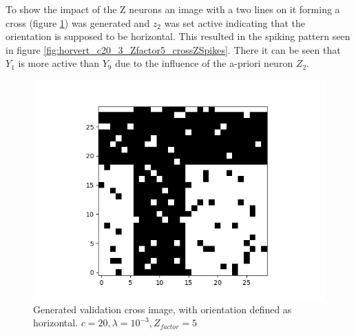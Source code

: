 To show the impact of the Z neurons an image with a two lines on it forming a cross (figure \ref{fig:horvertValidationCross}) was generated and $z_2$ was set active indicating that the orientation is supposed to be horizontal. This resulted in the spiking pattern seen in figure \ref{fig:horvert_c20_3_Zfactor5_crossZSpikes}. There it can be seen that $Y_1$ is more active than $Y_9$ due to the influence of the a-priori neuron $Z_2$.

\begin{figure}
  \includegraphics[width=\linewidth]{figures/horvert/horvert_c20_3_Zfactor5_validationCross.png}
  \caption{Generated validation cross image, with orientation defined as horizontal. $c = 20, \lambda = 10^{-3}, Z_{factor} = 5$}
  \label{fig:horvertValidationCross}
\end{figure}

